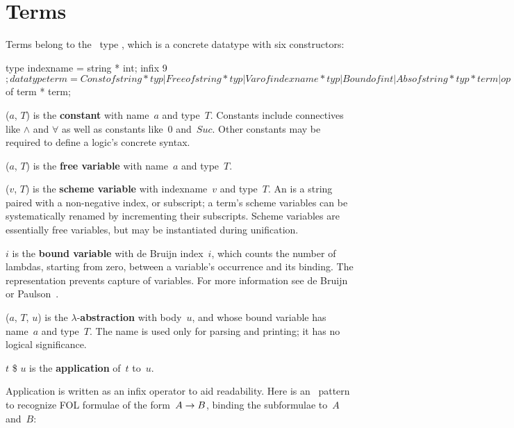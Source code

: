 \section{Terms}
Terms belong to the \ML\ type , which is a concrete datatype
with six constructors:
\begin{ttbox}
type indexname = string * int;
infix 9 $;
datatype term = Const of string * typ
              | Free  of string * typ
              | Var   of indexname * typ
              | Bound of int
              | Abs   of string * typ * term
              | op $  of term * term;
\end{ttbox}
\begin{ttdescription}
\item[\ttindexbold{Const} ($a$, $T$)] 
  is the \textbf{constant} with name~$a$ and type~$T$.  Constants include
  connectives like $\land$ and $\forall$ as well as constants like~0
  and~$Suc$.  Other constants may be required to define a logic's concrete
  syntax.

\item[\ttindexbold{Free} ($a$, $T$)] 
  is the \textbf{free variable} with name~$a$ and type~$T$.

\item[\ttindexbold{Var} ($v$, $T$)] 
  is the \textbf{scheme variable} with indexname~$v$ and type~$T$.  An
   is a string paired with a non-negative index, or
  subscript; a term's scheme variables can be systematically renamed by
  incrementing their subscripts.  Scheme variables are essentially free
  variables, but may be instantiated during unification.

\item[\ttindexbold{Bound} $i$] 
  is the \textbf{bound variable} with de Bruijn index~$i$, which counts the
  number of lambdas, starting from zero, between a variable's occurrence
  and its binding.  The representation prevents capture of variables.  For
  more information see de Bruijn \cite{debruijn72} or
  Paulson~\cite[page~376]{paulson-ml2}.

\item[\ttindexbold{Abs} ($a$, $T$, $u$)]
  is the $\lambda$-\textbf{abstraction} with body~$u$, and whose bound
  variable has name~$a$ and type~$T$.  The name is used only for parsing
  and printing; it has no logical significance.

\item[$t$ \$ $u$]  
is the \textbf{application} of~$t$ to~$u$.
\end{ttdescription}
Application is written as an infix operator to aid readability.  Here is an
\ML\ pattern to recognize FOL formulae of the form~$A\rightarrow B$, binding the
subformulae to~$A$ and~$B$:


